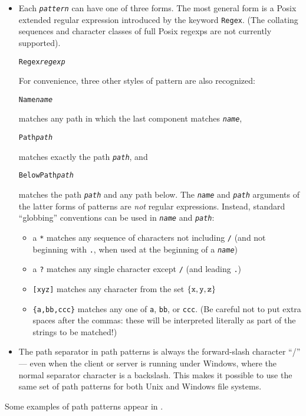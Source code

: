 \documentclass{article}
\newcommand{\ARG}[1]{\texttt{\textit{#1}}}
\begin{document}
\begin{itemize}
\item Each \ARG{pattern} can have one of three forms.  The most
general form is a Posix extended regular expression introduced by the
keyword \verb|Regex|.  (The collating sequences and character classes of
full Posix regexps are not currently supported).
\begin{alltt}
                 Regex \ARG{regexp}
\end{alltt}
For convenience, three other styles of pattern are also recognized:
\begin{alltt}
                 Name \ARG{name}
\end{alltt}
matches any path in which the last component matches \ARG{name},
\begin{alltt}
                 Path \ARG{path}
\end{alltt}
matches exactly the path \ARG{path}, and
\begin{alltt}
                 BelowPath \ARG{path}
\end{alltt}
matches the path \ARG{path} and any path below.
%
The \ARG{name} and \ARG{path} arguments of the latter forms of
patterns are {\em not} regular expressions.  Instead, 
standard ``globbing'' conventions can be used in \ARG{name} and
\ARG{path}:  
\begin{itemize}
\item a \verb|*| matches any sequence of characters not including \verb|/|
(and not beginning with \verb|.|, when used at the beginning of a
\ARG{name})
\item a \verb|?| matches any single character except \verb|/| (and leading
  \verb|.|) 
\item \verb|[xyz]| matches any character from the set $\{{\tt x},
  {\tt y}, {\tt z} \}$
\item \verb|{a,bb,ccc}| matches any one of \verb|a|, \verb|bb|, or
  \verb|ccc|.  (Be careful not to put extra spaces after the commas:
  these will be interpreted literally as part of the strings to be matched!) 
\end{itemize}
\item 
The path separator in path patterns is always the
forward-slash character ``/'' --- even when the client or server is
running under Windows, where the normal separator character is a
backslash.  This makes it possible to use the same set of path
patterns for both Unix and Windows file systems.  
\end{itemize}
Some examples of path patterns appear in .
\end{document}
